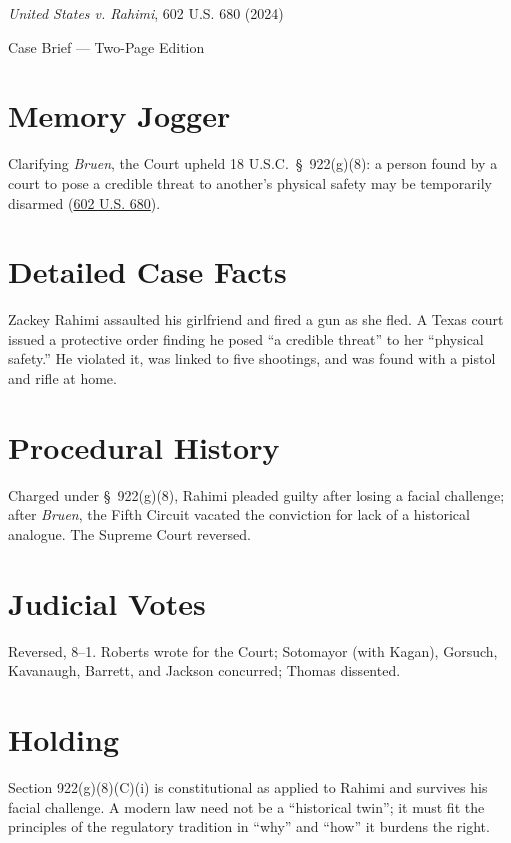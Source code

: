 \documentclass[12pt]{article}
\begin{document}
\begin{center}
{\LARGE \textit{United States v. Rahimi}, 602 U.S. 680 (2024)\par}
\vspace{0.5em}
{\large Case Brief --- Two-Page Edition\par}
\end{center}

\section{Memory Jogger}
Clarifying \textit{Bruen}, the Court upheld 18 U.S.C.\ \S\ 922(g)(8): a person found by a court to pose a credible threat to another's physical safety may be temporarily disarmed (\href{https://www.law.cornell.edu/supremecourt/text/22-915}{602 U.S. 680}).

\section{Detailed Case Facts}
Zackey Rahimi assaulted his girlfriend and fired a gun as she fled. A Texas court issued a protective order finding he posed ``a credible threat'' to her ``physical safety.'' He violated it, was linked to five shootings, and was found with a pistol and rifle at home.

\section{Procedural History}
Charged under \S\ 922(g)(8), Rahimi pleaded guilty after losing a facial challenge; after \textit{Bruen}, the Fifth Circuit vacated the conviction for lack of a historical analogue. The Supreme Court reversed.

\section{Judicial Votes}
Reversed, 8--1. Roberts wrote for the Court; Sotomayor (with Kagan), Gorsuch, Kavanaugh, Barrett, and Jackson concurred; Thomas dissented.

\section{Holding}
Section 922(g)(8)(C)(i) is constitutional as applied to Rahimi and survives his facial challenge. A modern law need not be a ``historical twin''; it must fit the principles of the regulatory tradition in ``why'' and ``how'' it burdens the right.
\end{document}
